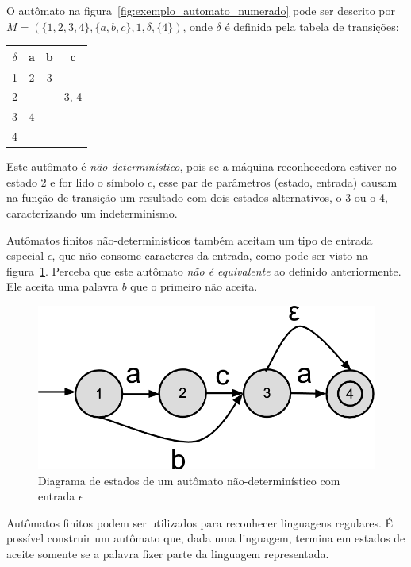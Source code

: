 \documentclass[a4paper,12pt,oneside,onecolumn]{uerj}
\begin{document}
O autômato na figura~\ref{fig:exemplo_automato_numerado} pode ser descrito por $M=(\{1,2,3,4\}, \{a,b,c\}, 1, \delta, \{4\})$, onde $\delta$ é definida pela tabela de transições:

\begin{center}
	\begin{tabular}{ c || c | c | c }
		{\bf $\delta$} & {\bf a} & {\bf b} & {\bf c} \\
		\hline 
		\hline 
		1 & 2 & 3 &  \\ 
		\hline 
		2 &   &   & 3, 4 \\ 
		\hline 
		3 & 4 &   &  \\ 
		\hline 
		4 &   &   &  \\ 
	\end{tabular}
\end{center}

Este autômato é \emph{não determinístico}, pois se a máquina reconhecedora estiver no  estado 2 e for lido o símbolo $c$, esse par de parâmetros (estado, entrada) causam na função de transição um resultado com dois estados alternativos, o 3 ou o 4, caracterizando um indeterminismo.

Autômatos finitos não-determinísticos também aceitam um tipo de entrada especial $\epsilon$, que não consome caracteres da entrada, como pode ser visto na figura~\ref{fig:exemplo_automato_epsilon}. Perceba que este autômato \emph{não é equivalente} ao definido anteriormente. Ele aceita uma palavra $b$ que o primeiro não aceita.

\begin{figure}[!htbp]
  \centering
  \includegraphics[scale=0.3]{figures/exemplo_automato_epsilon.png}
  \caption{Diagrama de estados de um autômato não-determinístico com entrada $\epsilon$}
  \label{fig:exemplo_automato_epsilon}
\end{figure}


Autômatos finitos podem ser utilizados para reconhecer linguagens regulares. É possível construir um autômato que, dada uma linguagem, termina em estados de aceite somente se a palavra fizer parte da linguagem representada.
\end{document}
